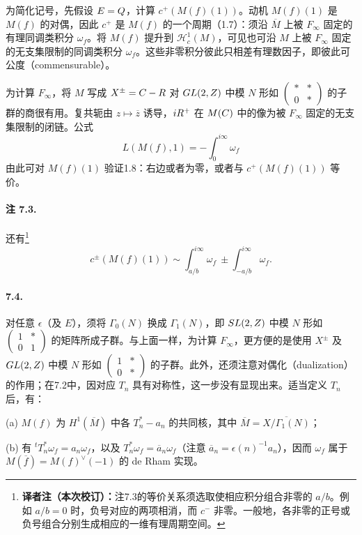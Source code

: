 为简化记号，先假设 $E=Q$，计算 $c^+(M(f)(1))$。动机 $M(f)(1)$ 是 $M(f)$ 的对偶，因此 $c^+$ 是 $M(f)$ 的一个周期（1.7）：须沿 $\overline M$ 上被 $F_\infty$ 固定的有理同调类积分 $\omega_f$。将 $M(f)$ 提升到 $\mathcal H_c^1(M)$，可见也可沿 $M$ 上被 $F_\infty$ 固定的无支集限制的同调类积分 $\omega_f$。这些非零积分彼此只相差有理数因子，即彼此可公度（commensurable）。

为计算 $F_\infty$，将 $M$ 写成 $X^\pm=C-R$ 对 $GL(2,Z)$ 中模 $N$ 形如 $\left(\begin{smallmatrix}*&*\\0&*\end{smallmatrix}\right)$ 的子群的商很有用。复共轭由 $z\mapsto\overline z$ 诱导，$iR^+$ 在 $M(C)$ 中的像为被 $F_\infty$ 固定的无支集限制的闭链。公式
\[
 L(M(f),1)=-\int_0^{i\infty}\omega_f
\]
由此可对 $M(f)(1)$ 验证1.8：右边或者为零，或者与 $c^+(M(f)(1))$ 等价。

\paragraph*{注 7.3.}
还有\footnote{\textbf{译者注（本次校订）：}注7.3的等价关系须选取使相应积分组合非零的 $a/b$。例如 $a/b=0$ 时，负号对应的两项相消，而 $c^-$ 非零。一般地，各非零的正号或负号组合分别生成相应的一维有理周期空间。}
\[
 c^\pm(M(f)(1))\sim\int_{a/b}^{i\infty}\omega_f
 \ \pm\int_{-a/b}^{i\infty}\omega_f.
\]


\paragraph*{7.4.}
对任意 $\epsilon$（及 $E$），须将 $\Gamma_0(N)$ 换成 $\Gamma_1(N)$，即 $SL(2,Z)$ 中模 $N$ 形如 $\left(\begin{smallmatrix}1&*\\0&1\end{smallmatrix}\right)$ 的矩阵所成子群。与上面一样，为计算 $F_\infty$，更方便的是使用 $X^\pm$ 及 $GL(2,Z)$ 中模 $N$ 形如 $\left(\begin{smallmatrix}1&*\\0&*\end{smallmatrix}\right)$ 的子群。此外，还须注意对偶化（dualization）的作用；在7.2中，因对应 $T_n$ 具有对称性，这一步没有显现出来。适当定义 $T_n$ 后，有：

(a) $M(f)$ 为 $H^1(\overline M)$ 中各 $T_n^*-a_n$ 的共同核，其中 $\overline M=\overline{X/\Gamma_1(N)}$；

(b) 有 ${}^tT_n^*\omega_f=a_n\omega_f$，以及 $T_n^*\omega_f=\overline a_n\omega_f$（注意 $\overline a_n=\epsilon(n)^{-1}a_n$），因而 $\omega_f$ 属于 $M(\overline f)=M(f)^\vee(-1)$ 的 de Rham 实现。


